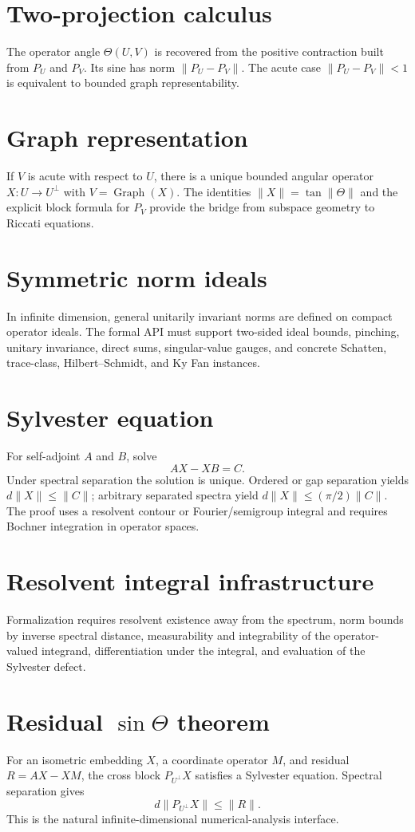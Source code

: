 \documentclass{article}
\newcommand{\Graph}{\operatorname{Graph}}
\begin{document}
\section{Two-projection calculus}
The operator angle $\Theta(U,V)$ is recovered from the positive contraction
built from $P_U$ and $P_V$.  Its sine has norm $\|P_U-P_V\|$.  The acute case
$\|P_U-P_V\|<1$ is equivalent to bounded graph representability.

\section{Graph representation}
If $V$ is acute with respect to $U$, there is a unique bounded angular
operator $X:U\to U^\perp$ with $V=\Graph(X)$.  The identities
$\|X\|=\tan\|\Theta\|$ and the explicit block formula for $P_V$ provide the
bridge from subspace geometry to Riccati equations.

\section{Symmetric norm ideals}
In infinite dimension, general unitarily invariant norms are defined on
compact operator ideals.  The formal API must support two-sided ideal bounds,
pinching, unitary invariance, direct sums, singular-value gauges, and concrete
Schatten, trace-class, Hilbert--Schmidt, and Ky Fan instances.

\section{Sylvester equation}
For self-adjoint $A$ and $B$, solve
\[
  AX-XB=C.
\]
Under spectral separation the solution is unique.  Ordered or gap separation
yields $d\|X\|\le\|C\|$; arbitrary separated spectra yield
$d\|X\|\le(\pi/2)\|C\|$.  The proof uses a resolvent contour or Fourier/semigroup
integral and requires Bochner integration in operator spaces.

\section{Resolvent integral infrastructure}
Formalization requires resolvent existence away from the spectrum, norm
bounds by inverse spectral distance, measurability and integrability of the
operator-valued integrand, differentiation under the integral, and evaluation
of the Sylvester defect.

\section{Residual $\sin\Theta$ theorem}
For an isometric embedding $X$, a coordinate operator $M$, and residual
$R=AX-XM$, the cross block $P_{U^\perp}X$ satisfies a Sylvester equation.
Spectral separation gives
\[
 d\|P_{U^\perp}X\|\le\|R\|.
\]
This is the natural infinite-dimensional numerical-analysis interface.
\end{document}
